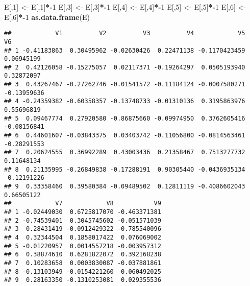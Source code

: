 \documentclass[
]{article}
\newenvironment{Shaded}{\begin{snugshade}}{\end{snugshade}}
\newcommand{\DecValTok}[1]{\textcolor[rgb]{0.00,0.00,0.81}{#1}}
\newcommand{\KeywordTok}[1]{\textcolor[rgb]{0.13,0.29,0.53}{\textbf{#1}}}
\newcommand{\NormalTok}[1]{#1}
\newcommand{\OperatorTok}[1]{\textcolor[rgb]{0.81,0.36,0.00}{\textbf{#1}}}
\newcommand{\StringTok}[1]{\textcolor[rgb]{0.31,0.60,0.02}{#1}}
\begin{document}
\begin{Shaded}
\begin{Highlighting}[]
\NormalTok{E[,}\DecValTok{1}\NormalTok{] <-}\StringTok{ }\NormalTok{E[,}\DecValTok{1}\NormalTok{]}\OperatorTok{*-}\DecValTok{1}
\NormalTok{E[,}\DecValTok{3}\NormalTok{] <-}\StringTok{ }\NormalTok{E[,}\DecValTok{3}\NormalTok{]}\OperatorTok{*-}\DecValTok{1}
\NormalTok{E[,}\DecValTok{4}\NormalTok{] <-}\StringTok{ }\NormalTok{E[,}\DecValTok{4}\NormalTok{]}\OperatorTok{*-}\DecValTok{1}
\NormalTok{E[,}\DecValTok{5}\NormalTok{] <-}\StringTok{ }\NormalTok{E[,}\DecValTok{5}\NormalTok{]}\OperatorTok{*-}\DecValTok{1}
\NormalTok{E[,}\DecValTok{6}\NormalTok{] <-}\StringTok{ }\NormalTok{E[,}\DecValTok{6}\NormalTok{]}\OperatorTok{*-}\DecValTok{1}
\KeywordTok{as.data.frame}\NormalTok{(E)}
\end{Highlighting}
\end{Shaded}

\begin{verbatim}
##            V1          V2          V3          V4            V5          V6
## 1 -0.41183863  0.30495962 -0.02630426  0.22471138 -0.1170423459  0.06945199
## 2  0.42126058 -0.15275057  0.02117371 -0.19264297  0.0505193940  0.32872097
## 3  0.43267467 -0.27262746 -0.01541572 -0.11184124 -0.0007580271 -0.13959636
## 4 -0.24359382 -0.60358357 -0.13748733 -0.01310136  0.3195863976  0.55696819
## 5  0.09467774  0.27920580 -0.86875660 -0.09974950  0.3762605416 -0.08156841
## 6  0.44601607 -0.03843375  0.03403742 -0.11056800 -0.0814563461 -0.28291553
## 7  0.20624555  0.36992289  0.43003436  0.21358467  0.7513277732  0.11648134
## 8  0.21135995 -0.26849838 -0.17288191  0.90305440 -0.0436935134 -0.12191226
## 9  0.33358460  0.39580384 -0.09489502  0.12811119 -0.4086602043  0.66505122
##            V7            V8           V9
## 1 -0.02449030  0.6725817070 -0.463371381
## 2 -0.74539401  0.3045745602 -0.051571039
## 3  0.28431419 -0.0912429322 -0.785540096
## 4  0.32344504  0.1858017422  0.076069002
## 5 -0.01220957  0.0014557218 -0.003957312
## 6  0.38874610  0.6281822072  0.392168238
## 7  0.10283658  0.0003830087 -0.037881861
## 8 -0.13103949 -0.0154221260  0.060492025
## 9  0.28163350 -0.1310253081  0.029355536
\end{verbatim}
\end{document}

